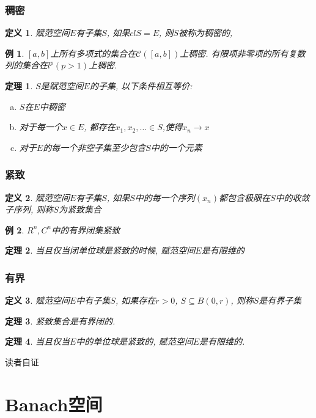 \documentclass[a4paper,11pt]{book}
\newtheorem{definition}{\hspace{2em}定义}[section]
\newtheorem{theorem}{\hspace{2em}定理}[section]
\newtheorem{example}{例}[section]
\begin{document}
\subsubsection*{稠密}
\begin{definition}
  赋范空间$E$有子集$S$, 如果$cl S=E$, 则$S$被称为稠密的,
\end{definition}
\begin{example}
  $[a,b]$上所有多项式的集合在$\mathcal{C}([a,b])$上稠密. 有限项非零项的所有复数列的集合在$l^p(p>1)$上稠密.
\end{example}
\begin{theorem}
  $S$是赋范空间$E$的子集, 以下条件相互等价:
  \begin{enumerate}[(a)]
    \item $S$在$E$中稠密
    \item 对于每一个$x\in E$, 都存在$x_1,x_2,\dots\in S$,使得$x_n\to x$
    \item 对于$E$的每一个非空子集至少包含$S$中的一个元素
  \end{enumerate}
\end{theorem}
\subsubsection*{紧致}
\begin{definition}
  赋范空间$E$有子集$S$, 如果$S$中的每一个序列$(x_n)$都包含极限在$S$中的收敛子序列, 则称$S$为紧致集合
\end{definition}
\begin{example}
  $R^n,C^n$中的有界闭集紧致
\end{example}
\begin{theorem}
  当且仅当闭单位球是紧致的时候, 赋范空间$E$是有限维的
\end{theorem}
\subsubsection*{有界}
\begin{definition}
  赋范空间$E$中有子集$S$, 如果存在$r>0$, $S\subseteq B(0,r)$, 则称$S$是有界子集
\end{definition}
\begin{theorem}
  紧致集合是有界闭的.
\end{theorem}
\begin{theorem}
  当且仅当$E$中的单位球是紧致的, 赋范空间$E$是有限维的.
\end{theorem}
读者自证
\section{Banach空间}
\end{document}
